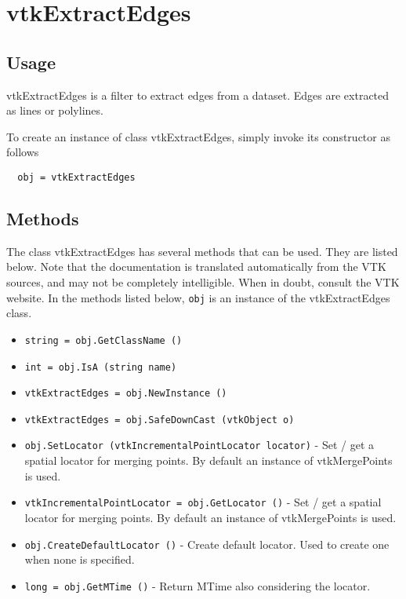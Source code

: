 \section{vtkExtractEdges}

\subsection{Usage}

 vtkExtractEdges is a filter to extract edges from a dataset. Edges
 are extracted as lines or polylines.

To create an instance of class vtkExtractEdges, simply
invoke its constructor as follows
\begin{verbatim}
  obj = vtkExtractEdges
\end{verbatim}
\subsection{Methods}

The class vtkExtractEdges has several methods that can be used.
  They are listed below.
Note that the documentation is translated automatically from the VTK sources,
and may not be completely intelligible.  When in doubt, consult the VTK website.
In the methods listed below, \verb|obj| is an instance of the vtkExtractEdges class.
\begin{itemize}
\item  \verb|string = obj.GetClassName ()|

\item  \verb|int = obj.IsA (string name)|

\item  \verb|vtkExtractEdges = obj.NewInstance ()|

\item  \verb|vtkExtractEdges = obj.SafeDownCast (vtkObject o)|

\item  \verb|obj.SetLocator (vtkIncrementalPointLocator locator)| -  Set / get a spatial locator for merging points. By
 default an instance of vtkMergePoints is used.

\item  \verb|vtkIncrementalPointLocator = obj.GetLocator ()| -  Set / get a spatial locator for merging points. By
 default an instance of vtkMergePoints is used.

\item  \verb|obj.CreateDefaultLocator ()| -  Create default locator. Used to create one when none is specified.

\item  \verb|long = obj.GetMTime ()| -  Return MTime also considering the locator.

\end{itemize}

